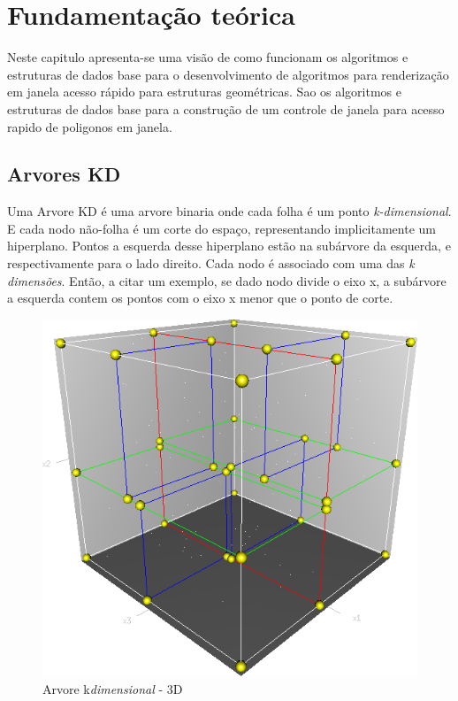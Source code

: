 \chapter{Fundamentação teórica}\label{cap:desenvolvimento}
Neste capitulo apresenta-se uma visão de como funcionam os algoritmos e estruturas de dados base para o desenvolvimento
de algoritmos para renderização em janela acesso rápido para estruturas geométricas.
Sao os algoritmos e estruturas de dados base para a construção de um controle de janela para acesso rapido de poligonos
em janela.



\section{Arvores KD}

Uma Arvore KD é uma arvore binaria onde cada folha é um ponto \textit{k-dimensional}.
E cada nodo não-folha é um corte do espaço, representando implicitamente um hiperplano.
Pontos a esquerda desse hiperplano estão na subárvore da esquerda, e respectivamente para o lado direito.
Cada nodo é associado com uma das \textit{k dimensões}. Então, a citar um exemplo, se dado nodo divide o eixo
x, a subárvore a esquerda contem os pontos com o eixo x menor que o ponto de corte.

\begin{figure}[htb]
    \caption{\label{fig:Fig_1}Arvore k\textit{dimensional} - 3D}
    \begin{center}
        \includegraphics[width=\linewidth/2]{images/3dtree.png}
    \end{center}
\end{figure}

